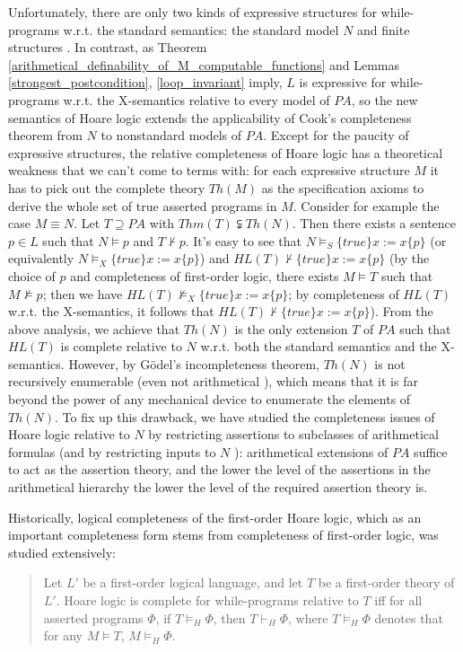 \documentclass[a4paper,11pt]{article}
\begin{document}
Unfortunately, there are only two kinds of expressive structures for while-programs w.r.t. the standard semantics: the standard model $N$ and finite structures \cite{lipton_1}. In contrast, as Theorem \ref{arithmetical_definability_of_M_computable_functions} and Lemmas \ref{strongest_postcondition}, \ref{loop_invariant} imply, $L$ is expressive for while-programs w.r.t. the X-semantics relative to every model of $PA$, so the new semantics of Hoare logic extends the applicability of Cook's completeness theorem from $N$ to nonstandard models of $PA$. Except for the paucity of expressive structures, the relative completeness of Hoare logic has a theoretical weakness that we can't come to terms with: for each expressive structure $M$ it has to pick out the complete theory $Th(M)$ as the specification axioms to derive the whole set of true asserted programs in $M$. Consider for example the case $M\equiv N$. Let $T \supseteq PA$ with $Thm(T)\subsetneqq Th(N)$. Then there exists a sentence $p\in L$ such that $N\models p$ and $T\nvdash p$. It's easy to see that $N\models_S \{true\} x := x \{p\}$ (or equivalently $N\models_X \{true\} x := x \{p\}$) and $HL(T)\nvdash \{true\} x := x \{p\}$ (by the choice of $p$ and completeness of first-order logic, there exists $M\models T$ such that $M\nvDash p$; then we have $HL(T)\nvDash_X \{true\} x := x \{p\}$; by completeness of $HL(T)$ w.r.t. the X-semantics, it follows that $HL(T)\nvdash \{true\} x := x \{p\}$). From the above analysis, we achieve that $Th(N)$ is the only extension $T$ of $PA$ such that $HL(T)$ is complete relative to $N$ w.r.t. both the standard semantics and the X-semantics. However, by G\"{o}del's incompleteness theorem, $Th(N)$ is not recursively enumerable (even not arithmetical \cite[Lemma 17.3]{c. and l.}), which means that it is far beyond the power of any mechanical device to enumerate the elements of $Th(N)$. To fix up this drawback, we have studied the completeness issues of Hoare logic relative to $N$ by restricting assertions to subclasses of arithmetical formulas \cite{xu17} (and by restricting inputs to $N$ \cite{xu_3}): arithmetical extensions of $PA$ suffice to act as the assertion theory, and the lower the level of the assertions in the arithmetical hierarchy the lower the level of the required assertion theory is.

Historically, logical completeness of the first-order Hoare logic, which as an important completeness form stems from completeness of first-order logic, was studied extensively:
\begin{quote}
  Let $L'$ be a first-order logical language, and let $T$ be a first-order theory of $L'$. Hoare logic is complete for while-programs relative to $T$ iff for all asserted programs $\Phi$, if $T\models_H \Phi$, then $T\vdash_H \Phi$, where $T\models_H \Phi$ denotes that for any $M\models T$, $M\models_H \Phi$.
\end{quote}
\end{document}
